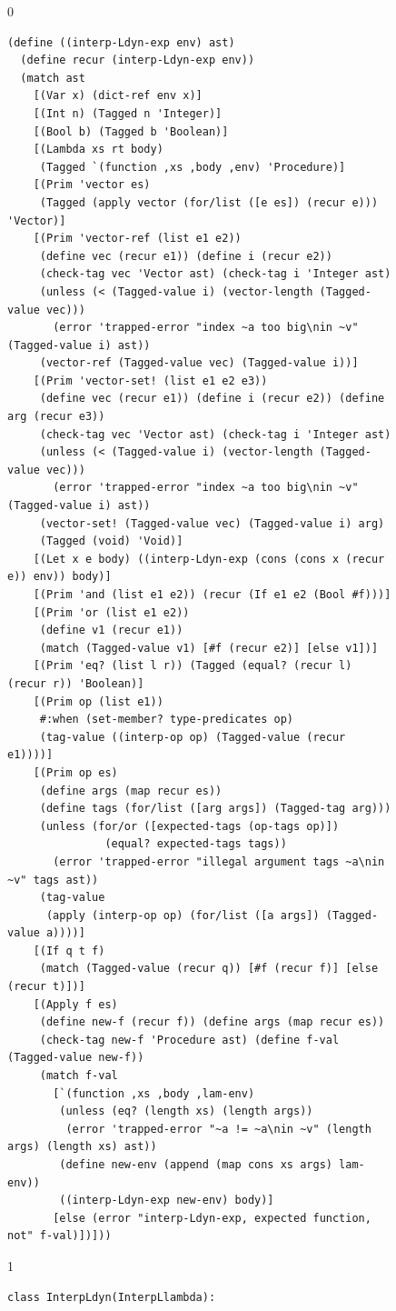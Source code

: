 \documentclass[7x10]{TimesAPriori_MIT}%
\def\racketEd{0}
\def\pythonEd{1}
\def\edition{1}
\newcommand{\pythonColor}[0]{}
\numberwithin{theorem}{chapter}
\numberwithin{definition}{chapter}
\numberwithin{equation}{chapter}
\begin{document}
\begin{figure}[tbp]
  \begin{tcolorbox}[colback=white]
    {\if\edition\racketEd
\begin{lstlisting}[basicstyle=\ttfamily\footnotesize]
(define ((interp-Ldyn-exp env) ast)
  (define recur (interp-Ldyn-exp env))
  (match ast
    [(Var x) (dict-ref env x)]
    [(Int n) (Tagged n 'Integer)]
    [(Bool b) (Tagged b 'Boolean)]
    [(Lambda xs rt body)
     (Tagged `(function ,xs ,body ,env) 'Procedure)]
    [(Prim 'vector es)
     (Tagged (apply vector (for/list ([e es]) (recur e))) 'Vector)]
    [(Prim 'vector-ref (list e1 e2))
     (define vec (recur e1)) (define i (recur e2))
     (check-tag vec 'Vector ast) (check-tag i 'Integer ast)
     (unless (< (Tagged-value i) (vector-length (Tagged-value vec)))
       (error 'trapped-error "index ~a too big\nin ~v" (Tagged-value i) ast))
     (vector-ref (Tagged-value vec) (Tagged-value i))]
    [(Prim 'vector-set! (list e1 e2 e3))
     (define vec (recur e1)) (define i (recur e2)) (define arg (recur e3))
     (check-tag vec 'Vector ast) (check-tag i 'Integer ast)
     (unless (< (Tagged-value i) (vector-length (Tagged-value vec)))
       (error 'trapped-error "index ~a too big\nin ~v" (Tagged-value i) ast))
     (vector-set! (Tagged-value vec) (Tagged-value i) arg)
     (Tagged (void) 'Void)]
    [(Let x e body) ((interp-Ldyn-exp (cons (cons x (recur e)) env)) body)]
    [(Prim 'and (list e1 e2)) (recur (If e1 e2 (Bool #f)))]
    [(Prim 'or (list e1 e2))
     (define v1 (recur e1))
     (match (Tagged-value v1) [#f (recur e2)] [else v1])]
    [(Prim 'eq? (list l r)) (Tagged (equal? (recur l) (recur r)) 'Boolean)]
    [(Prim op (list e1))
     #:when (set-member? type-predicates op)
     (tag-value ((interp-op op) (Tagged-value (recur e1))))]
    [(Prim op es)
     (define args (map recur es))
     (define tags (for/list ([arg args]) (Tagged-tag arg)))
     (unless (for/or ([expected-tags (op-tags op)])
               (equal? expected-tags tags))
       (error 'trapped-error "illegal argument tags ~a\nin ~v" tags ast))
     (tag-value
      (apply (interp-op op) (for/list ([a args]) (Tagged-value a))))]
    [(If q t f)
     (match (Tagged-value (recur q)) [#f (recur f)] [else (recur t)])]
    [(Apply f es)
     (define new-f (recur f)) (define args (map recur es))
     (check-tag new-f 'Procedure ast) (define f-val (Tagged-value new-f))
     (match f-val 
       [`(function ,xs ,body ,lam-env)
        (unless (eq? (length xs) (length args))
         (error 'trapped-error "~a != ~a\nin ~v" (length args) (length xs) ast))
        (define new-env (append (map cons xs args) lam-env))
        ((interp-Ldyn-exp new-env) body)]
       [else (error "interp-Ldyn-exp, expected function, not" f-val)])]))
\end{lstlisting}
\fi}
{\if\edition\pythonEd\pythonColor
\begin{lstlisting}[basicstyle=\ttfamily\footnotesize]
class InterpLdyn(InterpLlambda):
  

\end{lstlisting}}
\end{tcolorbox}
\end{figure}
\end{document}
